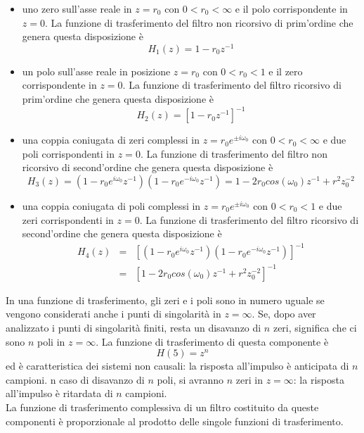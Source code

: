 \begin{itemize}
\item uno zero sull'asse reale in $z=r_0$ con $0 < r_0 < \infty$ e il polo corrispondente in $z=0$. La funzione di trasferimento del filtro non ricorsivo di prim'ordine che genera questa disposizione \`e 
\begin{displaymath}
H_1(z)=1-r_0 z^{-1}
\end{displaymath}
\item un polo sull'asse reale in posizione $z=r_0$ con $0 < r_0 < 1$ e il zero corrispondente in $z=0$. La funzione di trasferimento del filtro ricorsivo di prim'ordine che genera questa disposizione \`e 
\begin{displaymath}
H_2(z)=\left [1-r_0 z^{-1}\right ]^{-1}
\end{displaymath}
\item una coppia coniugata di zeri complessi in $z=r_0 e^{\pm i\omega_0}$ con $0 < r_0 < \infty$ e due poli corrispondenti in $z=0$. La funzione di trasferimento del filtro non ricorsivo di second'ordine che genera questa disposizione \`e 
\begin{displaymath}
H_3(z)=(1-r_0 e^{i\omega_0} z^{-1})(1-r_0 e^{-i\omega_0} z^{-1})=1-2r_0 cos(\omega_0)z^{-1}+r^2 z_0^{-2}
\end{displaymath}
\item una coppia coniugata di poli complessi in $z=r_0 e^{\pm i\omega_0}$ con $0 < r_0 < 1$ e due zeri corrispondenti in $z=0$. La funzione di trasferimento del filtro ricorsivo di second'ordine che genera questa disposizione \`e 
\begin{eqnarray*}
H_4(z) & = & \left[(1-r_0 e^{i\omega_0} z^{-1})(1-r_0 e^{-i\omega_0} z^{-1})\right ]^{-1} \\
       & = & \left[1-2r_0 cos(\omega_0)z^{-1}+r^2 z_0^{-2}\right]^{-1}
\end{eqnarray*}
\end{itemize}
In una funzione di trasferimento, gli zeri e i poli sono in numero uguale se vengono considerati anche i punti di singolarit\`a in $z=\infty$. Se, dopo aver analizzato i punti di singolarit\`a finiti, resta un disavanzo di $n$ zeri, significa che ci sono $n$ poli in $z=\infty$. La funzione di trasferimento di questa componente \`e 
\begin{displaymath}
H(5)=z^{n}
\end{displaymath}
ed \`e caratteristica dei sistemi non causali: la risposta all'impulso \`e anticipata di $n$ campioni. n caso di disavanzo di $n$ poli, si avranno $n$ zeri in $z=\infty$: la risposta all'impulso \`e ritardata di $n$ campioni.\\
La funzione di trasferimento complessiva di un filtro costituito da queste componenti \`e proporzionale al prodotto delle singole funzioni di trasferimento.

